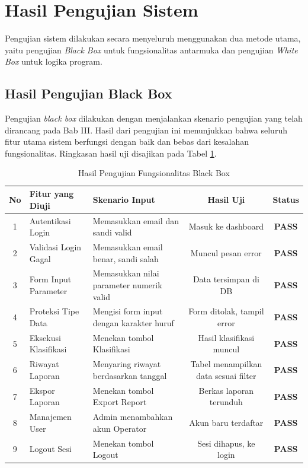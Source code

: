 \section{Hasil Pengujian Sistem}
Pengujian sistem dilakukan secara menyeluruh menggunakan dua metode utama, yaitu pengujian \textit{Black Box} untuk fungsionalitas antarmuka dan pengujian \textit{White Box} untuk logika program.

\subsection{Hasil Pengujian Black Box}
Pengujian \textit{black box} dilakukan dengan menjalankan skenario pengujian yang telah dirancang pada Bab III. Hasil dari pengujian ini menunjukkan bahwa seluruh fitur utama sistem berfungsi dengan baik dan bebas dari kesalahan fungsionalitas. Ringkasan hasil uji disajikan pada Tabel \ref{tab:hasil-blackbox}.

\begin{table}[htbp]
    \centering
    \caption{Hasil Pengujian Fungsionalitas Black Box}
    \label{tab:hasil-blackbox}
    \fontsize{9pt}{11pt}\selectfont
    \begin{tabularx}{\textwidth}{|c|p{3.5cm}|X|c|c|}
        \hline
        \textbf{No} & \textbf{Fitur yang Diuji} & \textbf{Skenario Input} & \textbf{Hasil Uji} & \textbf{Status} \\
        \hline
        1 & Autentikasi Login & Memasukkan email dan sandi valid & Masuk ke dashboard & \textbf{PASS} \\
        \hline
        2 & Validasi Login Gagal & Memasukkan email benar, sandi salah & Muncul pesan error & \textbf{PASS} \\
        \hline
        3 & Form Input Parameter & Memasukkan nilai parameter numerik valid & Data tersimpan di DB & \textbf{PASS} \\
        \hline
        4 & Proteksi Tipe Data & Mengisi form input dengan karakter huruf & Form ditolak, tampil error & \textbf{PASS} \\
        \hline
        5 & Eksekusi Klasifikasi & Menekan tombol Klasifikasi & Hasil klasifikasi muncul & \textbf{PASS} \\
        \hline
        6 & Riwayat Laporan & Menyaring riwayat berdasarkan tanggal & Tabel menampilkan data sesuai filter & \textbf{PASS} \\
        \hline
        7 & Ekspor Laporan & Menekan tombol Export Report & Berkas laporan terunduh & \textbf{PASS} \\
        \hline
        8 & Manajemen User & Admin menambahkan akun Operator & Akun baru terdaftar & \textbf{PASS} \\
        \hline
        9 & Logout Sesi & Menekan tombol Logout & Sesi dihapus, ke login & \textbf{PASS} \\
        \hline
    \end{tabularx}
\end{table}

